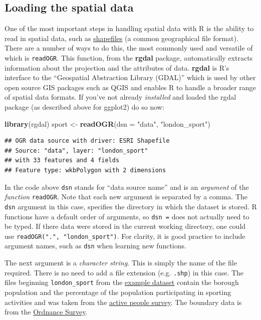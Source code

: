 \documentclass[]{article}
\newenvironment{Shaded}{}{}
\newcommand{\KeywordTok}[1]{\textcolor[rgb]{0.00,0.44,0.13}{\textbf{{#1}}}}
\newcommand{\DataTypeTok}[1]{\textcolor[rgb]{0.56,0.13,0.00}{{#1}}}
\newcommand{\StringTok}[1]{\textcolor[rgb]{0.25,0.44,0.63}{{#1}}}
\newcommand{\NormalTok}[1]{{#1}}
\begin{document}
\subsection{Loading the spatial data}\label{loading-the-spatial-data}

One of the most important steps in handling spatial data with R is the
ability to read in spatial data, such as
\href{http://en.wikipedia.org/wiki/Shapefile}{shapefiles} (a common
geographical file format). There are a number of ways to do this, the
most commonly used and versatile of which is \texttt{readOGR}. This
function, from the \textbf{rgdal} package, automatically extracts
information about the projection and the attributes of data.
\textbf{rgdal} is R's interface to the ``Geospatial Abstraction Library
(GDAL)'' which is used by other open source GIS packages such as QGIS
and enables R to handle a broader range of spatial data formats. If
you've not already \emph{installed} and loaded the rgdal package (as
described above for ggplot2) do so now:

\begin{Shaded}
\begin{Highlighting}[]
\KeywordTok{library}\NormalTok{(rgdal)}
\NormalTok{sport <-}\StringTok{ }\KeywordTok{readOGR}\NormalTok{(}\DataTypeTok{dsn =} \StringTok{"data"}\NormalTok{, }\StringTok{"london_sport"}\NormalTok{)}
\end{Highlighting}
\end{Shaded}

\begin{verbatim}
## OGR data source with driver: ESRI Shapefile 
## Source: "data", layer: "london_sport"
## with 33 features and 4 fields
## Feature type: wkbPolygon with 2 dimensions
\end{verbatim}

In the code above \texttt{dsn} stands for ``data source name'' and is an
\emph{argument} of the \emph{function} \texttt{readOGR}. Note that each
new argument is separated by a comma. The \texttt{dsn} argument in this
case, specifies the directory in which the dataset is stored. R
functions have a default order of arguments, so \texttt{dsn =} does not
actually need to be typed. If there data were stored in the current
working directory, one could use \texttt{readOGR(".", "london\_sport")}.
For clarity, it is good practice to include argument names, such as
\texttt{dsn} when learning new functions.

The next argument is a \emph{character string}. This is simply the name
of the file required. There is no need to add a file extension (e.g.
\texttt{.shp}) in this case. The files beginning \texttt{london\_sport}
from the
\href{http://spatial.ly/wp-content/uploads/2013/12/spatialggplot.zip}{example
dataset} contain the borough population and the percentage of the
population participating in sporting activities and was taken from the
\href{http://data.london.gov.uk/datastore/package/active-people-survey-kpi-data-borough}{active
people survey}. The boundary data is from the
\href{http://www.ordnancesurvey.co.uk/oswebsite/opendata/}{Ordnance
Survey}.
\end{document}
